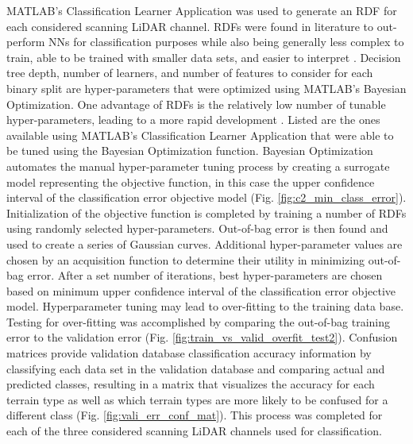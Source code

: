\documentclass[journal,onecolumn]{IEEEtran}
\begin{document}
			{MATLAB's Classification Learner Application was used to generate an RDF for each considered scanning LiDAR channel. RDFs were found in literature to out-perform NNs for classification purposes \cite{fernandez2014we} while also being generally less complex to train, able to be trained with smaller data sets, and easier to interpret \cite{nawar_comparison_2017, bernatz2020comparison, ahmad2017trees}. Decision tree depth, number of learners, and number of features to consider for each binary split are hyper-parameters that were optimized using MATLAB's Bayesian Optimization. One advantage of RDFs is the relatively low number of tunable hyper-parameters, leading to a more rapid development \cite{nawar_comparison_2017, bernatz2020comparison, ahmad2017trees}. Listed are the ones available using MATLAB's Classification Learner Application that were able to be tuned using the Bayesian Optimization function. Bayesian Optimization automates the manual hyper-parameter tuning process by creating a surrogate model representing the objective function, in this case the upper confidence interval of the classification error objective model (Fig. \ref{fig:c2_min_class_error}). Initialization of the objective function is completed by training a number of RDFs using randomly selected hyper-parameters. Out-of-bag error is then found and used to create a series of Gaussian curves. Additional hyper-parameter values are chosen by an acquisition function to determine their utility in minimizing out-of-bag error. After a set number of iterations, best hyper-parameters are chosen based on minimum upper confidence interval of the classification error objective model. Hyperparameter tuning may lead to over-fitting to the training data base. Testing for over-fitting was accomplished by comparing the out-of-bag training error to the validation error (Fig. \ref{fig:train_vs_valid_overfit_test2}). Confusion matrices provide validation database classification accuracy information by classifying each data set in the validation database and comparing actual and predicted classes, resulting in a matrix that visualizes the accuracy for each terrain type as well as which terrain types are more likely to be confused for a different class (Fig. \ref{fig:vali_err_conf_mat}). This process was completed for each of the three considered scanning LiDAR channels used for classification.}
	
\end{document}
